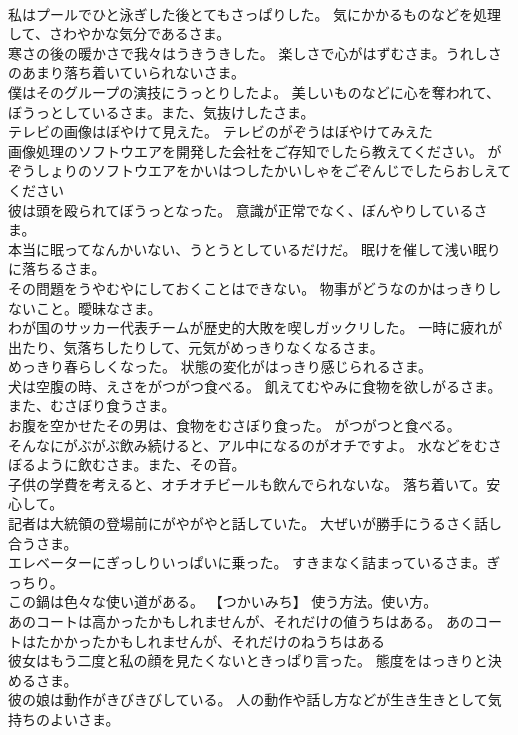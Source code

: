 \documentclass[8pt]{extreport}
\begin{document}
\begin{CJK}{UTF8}{min}
\\	私はプールでひと泳ぎした後とてもさっぱりした。	気にかかるものなどを処理して、さわやかな気分であるさま。
\\	寒さの後の暖かさで我々はうきうきした。	楽しさで心がはずむさま。うれしさのあまり落ち着いていられないさま。
\\	僕はそのグループの演技にうっとりしたよ。	美しいものなどに心を奪われて、ぼうっとしているさま。また、気抜けしたさま。
\\	テレビの画像はぼやけて見えた。	テレビのがぞうはぼやけてみえた 
\\	画像処理のソフトウエアを開発した会社をご存知でしたら教えてください。	がぞうしょりのソフトウエアをかいはつしたかいしゃをごぞんじでしたらおしえてください 
\\	彼は頭を殴られてぼうっとなった。	意識が正常でなく、ぼんやりしているさま。
\\	本当に眠ってなんかいない、うとうとしているだけだ。	眠けを催して浅い眠りに落ちるさま。
\\	その問題をうやむやにしておくことはできない。	物事がどうなのかはっきりしないこと。曖昧なさま。
\\	わが国のサッカー代表チームが歴史的大敗を喫しガックリした。	一時に疲れが出たり、気落ちしたりして、元気がめっきりなくなるさま。
\\	めっきり春らしくなった。	状態の変化がはっきり感じられるさま。
\\	犬は空腹の時、えさをがつがつ食べる。	飢えてむやみに食物を欲しがるさま。また、むさぼり食うさま。
\\	お腹を空かせたその男は、食物をむさぼり食った。	がつがつと食べる。
\\	そんなにがぶがぶ飲み続けると、アル中になるのがオチですよ。	水などをむさぼるように飲むさま。また、その音。
\\	子供の学費を考えると、オチオチビールも飲んでられないな。	落ち着いて。安心して。
\\	記者は大統領の登場前にがやがやと話していた。	大ぜいが勝手にうるさく話し合うさま。
\\	エレベーターにぎっしりいっぱいに乗った。	すきまなく詰まっているさま。ぎっちり。
\\	この鍋は色々な使い道がある。	【つかいみち】 使う方法。使い方。
\\	あのコートは高かったかもしれませんが、それだけの値うちはある。	あのコートはたかかったかもしれませんが、それだけのねうちはある 
\\	彼女はもう二度と私の顔を見たくないときっぱり言った。	態度をはっきりと決めるさま。
\\	彼の娘は動作がきびきびしている。	人の動作や話し方などが生き生きとして気持ちのよいさま。

\end{CJK}
\end{document}
